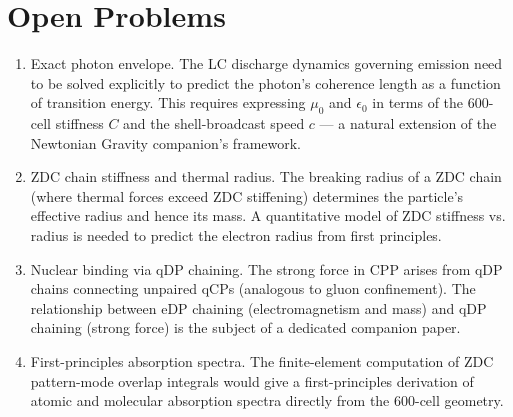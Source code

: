 \documentclass[12pt]{article}
\begin{document}
\section{Open Problems}
\begin{enumerate}
\item Exact photon envelope. The LC discharge dynamics governing emission need to be solved explicitly to predict the photon’s coherence length as a function of transition energy. This requires expressing \(\mu_0\) and \(\epsilon_0\) in terms of the 600-cell stiffness \(C\) and the shell-broadcast speed \(c\) — a natural extension of the Newtonian Gravity companion’s framework.
\item ZDC chain stiffness and thermal radius. The breaking radius of a ZDC chain (where thermal forces exceed ZDC stiffening) determines the particle’s effective radius and hence its mass. A quantitative model of ZDC stiffness vs. radius is needed to predict the electron radius from first principles.
\item Nuclear binding via qDP chaining. The strong force in CPP arises from qDP chains connecting unpaired qCPs (analogous to gluon confinement). The relationship between eDP chaining (electromagnetism and mass) and qDP chaining (strong force) is the subject of a dedicated companion paper.
\item First-principles absorption spectra. The finite-element computation of ZDC pattern-mode overlap integrals would give a first-principles derivation of atomic and molecular absorption spectra directly from the 600-cell geometry.
\end{enumerate}
\end{document}
